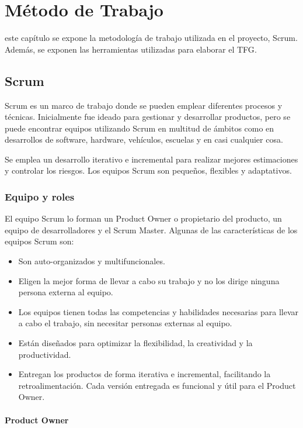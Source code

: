 \chapter{Método de Trabajo}
\label{chap:metodo}

 este capítulo se expone la metodología de trabajo utilizada en el proyecto, Scrum. Además,
se exponen las herramientas utilizadas para elaborar el \acs{TFG}.

\section{Scrum}

Scrum es un marco de trabajo donde se pueden emplear diferentes procesos y técnicas. Inicialmente 
fue ideado para gestionar y desarrollar productos, pero se puede encontrar equipos utilizando Scrum 
en multitud de ámbitos como en desarrollos de software, hardware, vehículos, escuelas y en casi cualquier 
cosa.

Se emplea un desarrollo iterativo e incremental para realizar mejores estimaciones y controlar 
los riesgos. Los equipos Scrum son pequeños, flexibles y adaptativos. 

\subsection{Equipo y roles}

El equipo Scrum lo forman un Product Owner o propietario del producto, un equipo de desarrolladores y el Scrum Master. Algunas
de las características de los equipos Scrum son:

\begin{itemize}
	\item Son auto-organizados y multifuncionales.
	\item Eligen la mejor forma de llevar a cabo su trabajo y no los dirige ninguna persona externa al equipo.
	\item Los equipos tienen todas las competencias y habilidades necesarias para llevar a cabo el trabajo,
	sin necesitar personas externas al equipo.
	\item Están diseñados para optimizar la flexibilidad, la creatividad y la productividad.
	\item Entregan los productos de forma iterativa e incremental, facilitando la retroalimentación. Cada versión entregada
	es funcional y útil para el Product Owner.
\end{itemize}

\subsubsection{Product Owner}

